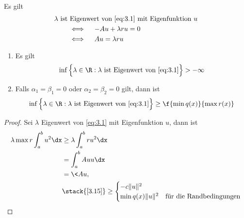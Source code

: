 \begin{nt*}
	Es gilt
	\begin{align*}
		&\text{$\lambda$ ist Eigenwert von \eqref{eq:3.1} mit Eigenfunktion $u$} \\
		&\qquad \iff \quad -Au + \lambda ru = 0 \\
		&\qquad\iff \quad Au = \lambda ru
	\end{align*}
\end{nt*}

\begin{st} \label{3.16}
	\begin{enumerate}[1)]
		\item
			Es gilt
			\[
				\inf \Big\{ \lambda \in \R : \text{$\lambda$ ist Eigenwert von \eqref{eq:3.1}} \Big\} > -\infty
			\]
		\item
			Falls $\alpha_1 = \beta_1 = 0$ oder $\alpha_2 = \beta_2 = 0$ gilt, dann ist
			\[
				\inf \Big\{ \lambda \in \R : \text{$\lambda$ ist Eigenwert von \eqref{eq:3.1}} \Big\} \ge \f {\min q(x)}{\max r(x)}
			\]
	\end{enumerate}
	\begin{proof}
		Sei $\lambda$ Eigenwert von \eqref{eq:3.1} mit Eigenfunktion $u$, dann ist
		\begin{align*}
			\lambda \max r \int_a^b u^2 \dx 
			&\ge \lambda \int_a^b r u^2 \dx \\
			&= \int_a^b Au u \dx \\
			&= \<Au,\> \\
			&\stack{\ref{3.15}}\ge \begin{cases}
				-c \|u\|^2 \\
				\min q(x) \|u\|^2 & \text{für die Randbedingungen}
			\end{cases}
		\end{align*}
	\end{proof}
\end{st}

